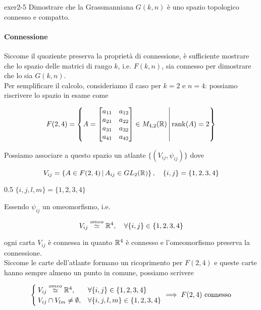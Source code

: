 {exer2-5}
{
Dimostrare che la Grassmanniana $ G(k,n) $ è uno spazio topologico connesso e compatto.
}
{
\paragraph{Connessione}

Siccome il quoziente preserva la proprietà di connessione, è sufficiente mostrare che lo spazio delle matrici di rango $ k $, i.e. $ F(k,n) $, sia connesso per dimostrare che lo sia $ G(k,n) $. \\
Per semplificare il calcolo, consideriamo il caso per $ k = 2 $ e $ n = 4 $: possiamo riscrivere lo spazio in esame come

\begin{equation}
	F(2,4) = \left\{ A = \bmqty{ a_{11} & a_{12} \\ a_{21} & a_{22} \\ a_{31} & a_{32} \\ a_{41} & a_{42} } \in M_{4,2}(\R) \st \rank(A) = 2 \right\}
\end{equation}

Possiamo associare a questo spazio un atlante $ \{(V_{ij},\psi_{ij})\} $ dove

\begin{equation}
	V_{ij} = \left\{ A \in F(2,4) \st A_{ij} \in GL_{2}(\R) \right\} %
	\qcomma \{i,j\} = \{1,2,3,4\}
\end{equation}

	{0.5}{%
			$ \{i,j,l,m\} = \{1,2,3,4\} $
			}

Essendo $ \psi_{ij} $ un omeomorfismo, i.e.

\begin{equation}
	V_{ij} \stackrel{omeo}{\simeq} \R^{4} \qcomma \forall \{i,j\} \in \{1,2,3,4\}
\end{equation}

ogni carta $ V_{ij} $ è connessa in quanto $ \mathbb{R}^{4} $ è connesso e l'omeomorfismo preserva la connessione. \\
Siccome le carte dell'atlante formano un ricoprimento per $ F(2,4) $ e queste carte hanno sempre almeno un punto in comune, possiamo scrivere

\begin{equation}
	\begin{cases}
		V_{ij} \stackrel{omeo}{\simeq} \R^{4}, & \forall \{i,j\} \in \{1,2,3,4\} \\
		V_{ij} \cap V_{lm} \neq \emptyset, & \forall \{i,j,l,m\} \in \{1,2,3,4\}
	\end{cases} %
	\implies %
	F(2,4) \text{ connesso}
\end{equation}

}
